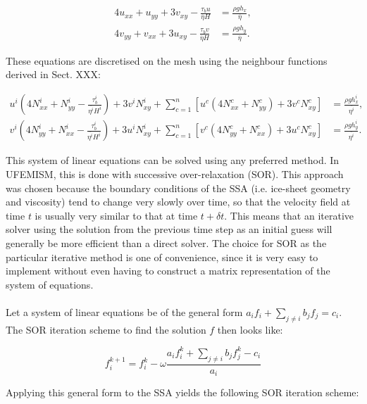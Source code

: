 \documentclass{article}
\begin{document}
\begin{align} \label{eq:SSA_simple}
4 u_{xx} + u_{yy} + 3 v_{xy} - \frac{\tau_b u}{\overline{\eta}H} &= \frac{\rho g h_x}{\overline{\eta}}, \\
4 v_{yy} + v_{xx} + 3 u_{xy} - \frac{\tau_b v}{\overline{\eta}H} &= \frac{\rho g h_y}{\overline{\eta}}.
\end{align}

These equations are discretised on the mesh using the neighbour functions derived in Sect. XXX:

\begin{align} \label{eq:SSA_disc}
u^i \left( 4 N_{xx}^i + N_{yy}^i - \frac{\tau_b^i}{\overline{\eta^i} H^i} \right) + 3 v^i N_{xy}^i + 
\sum_{c=1}^n \left[ u^c \left( 4 N_{xx}^c + N_{yy}^c \right) + 3 v^c N_{xy}^c \right] &= \frac{\rho g h_x^i}{\overline{\eta^i}}, \\
v^i \left( 4 N_{yy}^i + N_{xx}^i - \frac{\tau_b^i}{\overline{\eta^i} H^i} \right) + 3 u^i N_{xy}^i + 
\sum_{c=1}^n \left[ v^c \left( 4 N_{yy}^c + N_{xx}^c \right) + 3 u^c N_{xy}^c \right] &= \frac{\rho g h_y^i}{\overline{\eta^i}}.
\end{align}

This system of linear equations can be solved using any preferred method. In UFEMISM, this is done with successive over-relaxation (SOR). This approach was chosen because the boundary conditions of the SSA (i.e. ice-sheet geometry and viscosity) tend to change very slowly over time, so that the velocity field at time $t$ is usually very similar to that at time $t+\delta t$. This means that an iterative solver using the solution from the previous time step as an initial guess will generally be more efficient than a direct solver. The choice for SOR as the particular iterative method is one of convenience, since it is very easy to implement without even having to construct a matrix representation of the system of equations.\\
\\
Let a system of linear equations be of the general form $ a_i f_i + \sum_{j \neq i} b_j f_j = c_i$. The SOR iteration scheme to find the solution $f$ then looks like:

\begin{equation}
f_i^{k+1} = f_i^k - \omega \frac{a_i f_i^k + \sum_{j \neq i} b_j f_j^k - c_i}{a_i}
\end{equation}

Applying this general form to the SSA yields the following SOR iteration scheme:
\end{document}
